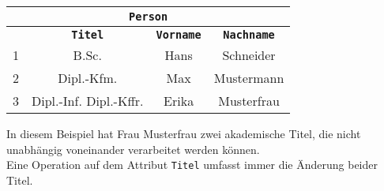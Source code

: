 \begin{frame}[t]\frametitle{\insertsection}
\framesubtitle{\insertsubsection}
\begin{center}
	\begin{tabular}{|c|c|c|c|}\hline
		\multicolumn{4}{|c|}{\small \textbf{\texttt{Person}}}\\\hline\hline
		\small \textbf{\key{\texttt{PNr}}} & \small \textbf{\texttt{Titel}}&\small \textbf{\texttt{Vorname}}&\small\textbf{\texttt{Nachname}} \\\hline 
		\small 1 &\small B.Sc. & \small Hans &\small Schneider  \\\hline 
		\small 2 &\small Dipl.-Kfm. & \small Max &\small Mustermann \\\hline 
		\small 3 &\cellcolor{Red}\small Dipl.-Inf. Dipl.-Kffr. &\small Erika &\small Musterfrau  \\\hline 
	\end{tabular}
\end{center}
In diesem Beispiel hat Frau Musterfrau zwei akademische Titel, die nicht unabh\"angig voneinander verarbeitet werden k\"onnen. 
\\[4pt]
Eine Operation auf dem Attribut \texttt{Titel} umfasst immer die \"Anderung beider Titel.
\end{frame}


